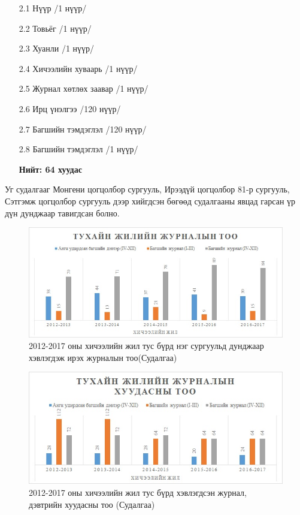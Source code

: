 \begin{enumerate}
	\begin{enumerate}
		\item[2.1] Нүүр /1 нүүр/
		\item[2.2] Товьёг /1 нүүр/
		\item[2.3] Хуанли /1 нүүр/
		\item[2.4] Хичээлийн хуваарь /1 нүүр/
		\item[2.5] Журнал хөтлөх заавар /1 нүүр/
		\item[2.6] Ирц үнэлгээ /120 нүүр/
		\item[2.7] Багшийн тэмдэглэл /120 нүүр/
		\item[2.8] {Багшийн тэмдэглэл /1 нүүр/} \hfill \break
		\begin{flushright}
			{\large \textbf{ Нийт: 64 хуудас}}
		\end{flushright}
	\end{enumerate}
\end{enumerate}
Уг судалгааг Монгени цогцолбор сургууль, Ирээдүй цогцолбор 81-р сургууль, Сэтгэмж цогцолбор сургууль дээр хийгдсэн бөгөөд судалгааны явцад гарсан үр дүн дунджаар тавигдсан болно.
\begin{figure}[htbp]
	\centering
	\includegraphics[scale=0.8]{Chart/Chart1}
	\caption[Хэрэглэгчийн судалгаа]{2012-2017 оны хичээлийн жил тус бүрд нэг сургуульд дунджаар хэвлэгдэж ирэх журналын тоо(Судалгаа)}
	\label{fig:Chart2}
\end{figure}
\begin{figure}[htbp]
	\centering
	\includegraphics[scale=0.8]{Chart/Chart2}
	\caption[Хэрэглэгчийн судалгаа]{2012-2017 оны хичээлийн жил тус бүрд хэвлэгдсэн журнал, дэвтрийн хуудасны тоо (Судалгаа)}
	\label{fig:Chart2}
\end{figure}

